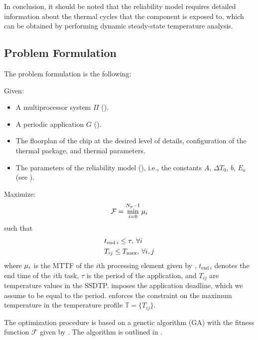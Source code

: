 In conclusion, it should be noted that the reliability model requires detailed
information about the thermal cycles that the component is exposed to, which can
be obtained by performing dynamic steady-state temperature analysis.

\subsection{Problem Formulation}

The problem formulation is the following:

Given:
\begin{itemize}

\item A multiprocessor system $\Pi$ ().

\item A periodic application $G$ ().

\item The floorplan of the chip at the desired level of details, configuration
of the thermal package, and thermal parameters.

\item The parameters of the reliability model (), i.e.,
the constants $A$, $\Delta T_0$, $b$, $E_a$ (see
).

\end{itemize}

Maximize:
\begin{equation} \elab{fitness-function}
  \mathcal{F} = \min_{i = 0}^{N_p - 1} \mean_i
\end{equation}
such that
\begin{align}
  & t_{\text{end} \: i} \leq \tau, \: \forall i \elab{deadline} \\
  & T_{ij} \leq T_\text{max}, \: \forall i, j \elab{t-max}
\end{align}
where $\mu_i$ is the MTTF of the $i$th processing element given by
, $t_{\text{end} \: i}$ denotes the end time of
the $i$th task, $\tau$ is the period of the application, and $T_{ij}$ are
temperature values in the SSDTP.  imposes the application
deadline, which we assume to be equal to the period.  enforces the
constraint on the maximum temperature in the temperature profile $\mathbb{T} =
\{ T_{ij} \}$.

The optimization procedure is based on a genetic algorithm (GA)
\cite{schmitz2004} with the fitness function $\mathcal{F}$ given by
. The algorithm is outlined in .

